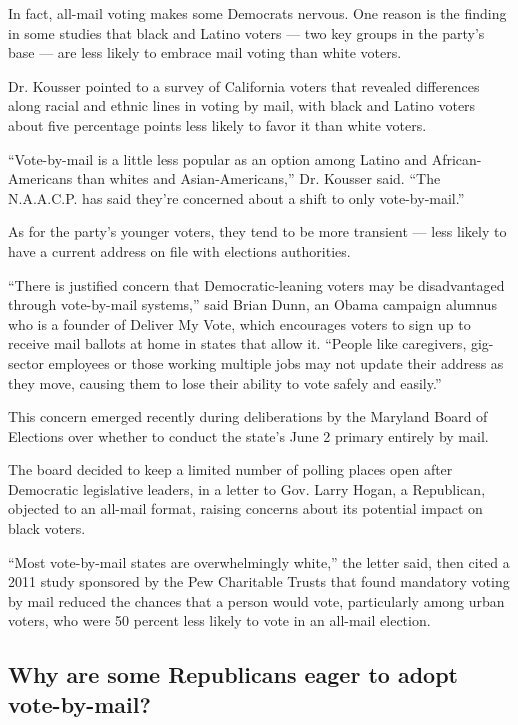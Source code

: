 In fact, all-mail voting makes some Democrats nervous. One reason is the
finding in some studies that black and Latino voters --- two key groups
in the party's base --- are less likely to embrace mail voting than
white voters.

Dr. Kousser pointed to a survey of California voters that revealed
differences along racial and ethnic lines in voting by mail, with black
and Latino voters about five percentage points less likely to favor it
than white voters.

``Vote-by-mail is a little less popular as an option among Latino and
African-Americans than whites and Asian-Americans,'' Dr. Kousser said.
``The N.A.A.C.P. has said they're concerned about a shift to only
vote-by-mail.''

As for the party's younger voters, they tend to be more transient ---
less likely to have a current address on file with elections
authorities.

``There is justified concern that Democratic-leaning voters may be
disadvantaged through vote-by-mail systems,'' said Brian Dunn, an Obama
campaign alumnus who is a founder of Deliver My Vote, which encourages
voters to sign up to receive mail ballots at home in states that allow
it. ``People like caregivers, gig-sector employees or those working
multiple jobs may not update their address as they move, causing them to
lose their ability to vote safely and easily.''

This concern emerged recently during deliberations by the Maryland Board
of Elections over whether to conduct the state's June 2 primary entirely
by mail.

The board decided to keep a limited number of polling places open after
Democratic legislative leaders, in a letter to Gov. Larry Hogan, a
Republican, objected to an all-mail format, raising concerns about its
potential impact on black voters.

``Most vote-by-mail states are overwhelmingly white,'' the letter said,
then cited a 2011 study sponsored by the Pew Charitable Trusts that
found mandatory voting by mail reduced the chances that a person would
vote, particularly among urban voters, who were 50 percent less likely
to vote in an all-mail election.

\hypertarget{why-are-some-republicans-eager-to-adopt-vote-by-mail}{%
\subsection{Why are some Republicans eager to adopt
vote-by-mail?}\label{why-are-some-republicans-eager-to-adopt-vote-by-mail}}

